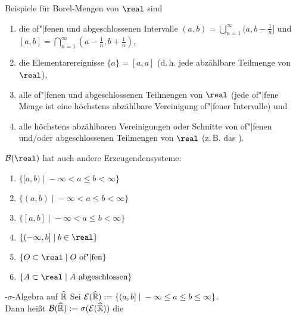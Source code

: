 \begin{Bsp}
    Beispiele für Borel-Mengen von $\real$ sind
    \begin{enumerate}
        \item
        die of"|fenen und abgeschlossenen Intervalle
        $(a, b) = \bigcup_{n=1}^\infty (a, b - \frac{1}{n}]$ und
        $[a, b] = \bigcap_{n=1}^\infty (a - \frac{1}{n}, b + \frac{1}{n})$,

        \item
        die Elementarereignisse $\{a\} = [a, a]$ (d.\,h. jede abzählbare Teilmenge von $\real$),

        \item
        alle of"|fenen und abgeschlossenen Teilmengen von $\real$
        (jede of"|fene Menge ist eine höchstens abzählbare Vereinigung of"|fener Intervalle) und

        \item
        alle höchstens abzählbaren Vereinigungen oder Schnitte von of"|fenen und/oder
        abgeschlossenen Teilmengen von $\real$
        (z.\,B. das ).
    \end{enumerate}
\end{Bsp}

\linie
\pagebreak

\begin{Bem}
    $\B(\real)$ hat auch andere Erzeugendensysteme:
    \begin{enumerate}
        \item
        $\{[a, b) \;|\; -\infty < a \le b < \infty\}$

        \item
        $\{(a, b) \;|\; -\infty < a \le b < \infty\}$

        \item
        $\{[a, b] \;|\; -\infty < a \le b < \infty\}$

        \item
        $\{(-\infty, b] \;|\; b \in \real\}$

        \item
        $\{O \subset \real \;|\; O \text{ of"|fen}\}$

        \item
        $\{A \subset \real \;|\; A \text{ abgeschlossen}\}$
    \end{enumerate}
\end{Bem}

\linie

\begin{Def}{-$\sigma$-Algebra auf $\widehat{\mathbb{R}}$}
    Sei $\mathcal{E}(\widehat{\mathbb{R}}) := \{(a, b] \;|\; -\infty \le a \le b \le \infty\}$.\\
    Dann heißt $\mathcal{B}(\widehat{\mathbb{R}}) := \sigma(\mathcal{E}(\widehat{\mathbb{R}}))$ die
\end{Def}

